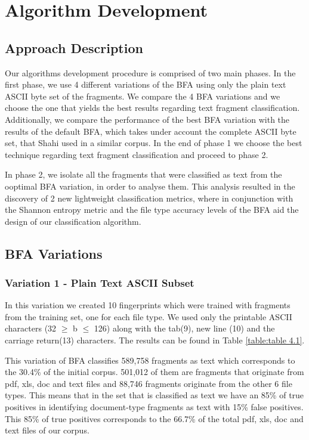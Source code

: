 \chapter{Algorithm Development}

\section{Approach Description}
Our algorithms development procedure is comprised of two main phases. In the first phase, we use 4 different variations of the BFA using only the plain text ASCII byte set of the fragments. We compare the 4 BFA variations and we choose the one that yields the best results regarding text fragment classification. Additionally, we compare the performance of the best BFA variation with the results of the default BFA, which takes under account the complete ASCII byte set, that Shahi\cite{Ashim} used in a similar corpus. In the end of phase 1 we choose the best technique regarding text fragment classification and proceed to phase 2.

In phase 2, we isolate all the fragments that were classified as text from the ooptimal BFA variation, in order to analyse them. This analysis resulted in the discovery of 2 new lightweight classification metrics, where in conjunction with the Shannon entropy\cite{Shannon} metric and the file type accuracy levels of the BFA aid the design of our classification algorithm.
\FloatBarrier

\section{BFA Variations}

\subsection{Variation 1 - Plain Text ASCII Subset}

In this variation we created 10 fingerprints which were trained with fragments from the training set, one for each file type. We used only the printable ASCII characters (32 $\geq$  b $\leq$ 126) along with the tab(9), new line (10) and the carriage return(13) characters. The results can be found in Table \ref{table:table 4.1}.

 This variation of BFA classifies 589,758 fragments as text which corresponds to the 30.4\% of the initial corpus. 501,012 of them are fragments that originate from pdf, xls, doc and text files and 88,746 fragments originate from the other 6 file types. This means that in the set that is classified as text we have an 85\% of true positives in identifying document-type fragments as text with 15\% false positives. This 85\% of true positives corresponds to the 66.7\% of the total pdf, xls, doc and text files of our corpus.\\

